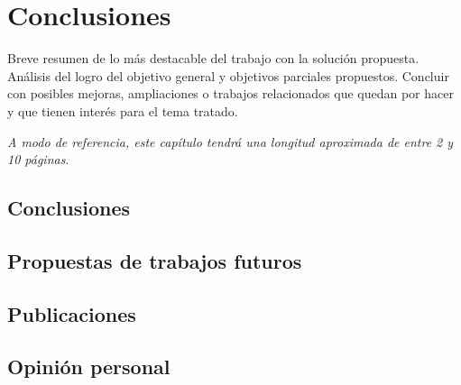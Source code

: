 \chapter{Conclusiones}
\label{chap:conclusiones}

\noindent
Breve resumen de lo más destacable del trabajo con la solución propuesta. Análisis
del logro del objetivo general y objetivos parciales propuestos. Concluir con
posibles mejoras, ampliaciones o trabajos relacionados que quedan por hacer y
que tienen interés para el tema tratado.

\emph{A modo de referencia, este capítulo tendrá una longitud aproximada de
  entre 2 y 10 páginas}.

\section{Conclusiones}
\section{Propuestas de trabajos futuros}
\section{Publicaciones}
\section{Opinión personal}
